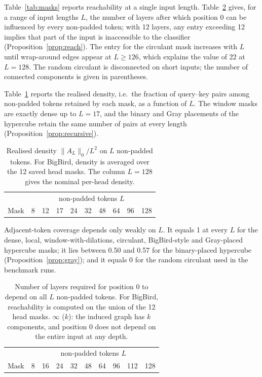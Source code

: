 \documentclass[10pt]{article}
\begin{document}
Table~\ref{tab:masks} reports reachability at a single input length. Table~\ref{tab:hops} gives, for a range of input lengths $L$, the number of layers after which position 0 can be influenced by every non-padded token; with 12 layers, any entry exceeding 12 implies that part of the input is inaccessible to the classifier (Proposition~\ref{prop:reach}). The entry for the circulant mask increases with $L$ until wrap-around edges appear at $L\ge126$, which explains the value of 22 at $L=128$. The random circulant is disconnected on short inputs; the number of connected components is given in parentheses.

Table~\ref{tab:validdensity} reports the realised density, i.e.\ the fraction of query--key pairs among non-padded tokens retained by each mask, as a function of $L$. The window masks are exactly dense up to $L=17$, and the binary and Gray placements of the hypercube retain the same number of pairs at every length (Proposition~\ref{prop:recursive}).

\begin{table}[H]
\centering
\caption{Realised density $\lVert A_L\rVert_0/L^2$ on $L$ non-padded tokens. For BigBird, density is averaged over the 12 saved head masks. The column $L=128$ gives the nominal per-head density.}
\label{tab:validdensity}
\scriptsize
\begin{tabular}{lrrrrrrrrr}
\toprule
 & \multicolumn{9}{c}{non-padded tokens $L$} \\
Mask & 8 & 12 & 17 & 24 & 32 & 48 & 64 & 96 & 128 \\
\midrule

\end{tabular}
\end{table}

Adjacent-token coverage depends only weakly on $L$. It equals 1 at every $L$ for the dense, local, window-with-dilations, circulant, BigBird-style and Gray-placed hypercube masks; it lies between 0.50 and 0.57 for the binary-placed hypercube (Proposition~\ref{prop:gray}); and it equals 0 for the random circulant used in the benchmark runs.

\begin{table}[H]
\centering
\caption{Number of layers required for position 0 to depend on all $L$ non-padded tokens. For BigBird, reachability is computed on the union of the 12 head masks. $\infty$ ($k$): the induced graph has $k$ components, and position 0 does not depend on the entire input at any depth.}
\label{tab:hops}
\scriptsize
\begin{tabular}{lrrrrrrrrr}
\toprule
 & \multicolumn{9}{c}{non-padded tokens $L$} \\
Mask & 8 & 16 & 24 & 32 & 48 & 64 & 96 & 112 & 128 \\
\midrule

\end{tabular}
\end{table}
\end{document}
